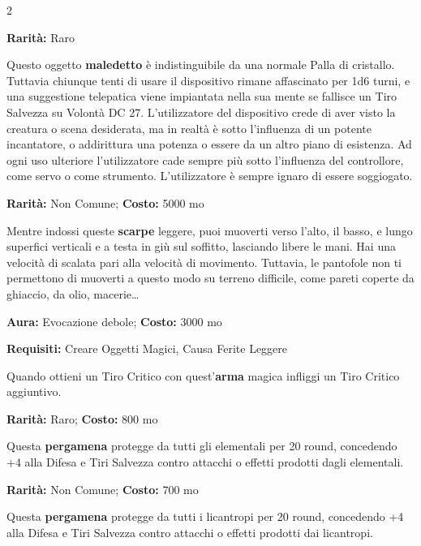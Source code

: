\begin{multicols}{2}

\textbf{Rarità:} Raro

Questo oggetto \textbf{maledetto} è indistinguibile da una normale Palla di cristallo. Tuttavia chiunque tenti di usare il dispositivo rimane affascinato per 1d6 turni, e una suggestione telepatica viene impiantata nella sua mente se fallisce un Tiro Salvezza su Volontà DC 27. L'utilizzatore del dispositivo crede di aver visto la creatura o scena desiderata, ma in realtà è sotto l'influenza di un potente incantatore, o addirittura una potenza o essere da un altro piano di esistenza. Ad ogni uso ulteriore l'utilizzatore cade sempre più sotto l'influenza del controllore, come servo o come strumento. L'utilizzatore è sempre ignaro di essere soggiogato.


\textbf{Rarità:} Non Comune; \textbf{Costo:} 5000 mo

Mentre indossi queste \textbf{scarpe} leggere, puoi muoverti verso l'alto, il basso, e lungo superfici verticali e a testa in giù sul soffitto, lasciando libere le mani. Hai una velocità di scalata pari alla velocità di movimento. Tuttavia, le pantofole non ti permettono di muoverti a questo modo su terreno difficile, come pareti coperte da ghiaccio, da olio, macerie…


\textbf{Aura:} Evocazione debole; \textbf{Costo:} 3000 mo

\textbf{Requisiti:} Creare Oggetti Magici, Causa Ferite Leggere

Quando ottieni un Tiro Critico con quest'\textbf{arma} magica infliggi un Tiro Critico aggiuntivo.


\textbf{Rarità:} Raro; \textbf{Costo:} 800 mo

Questa \textbf{pergamena} protegge da tutti gli elementali per 20 round, concedendo +4 alla Difesa e Tiri Salvezza contro attacchi o effetti prodotti dagli elementali.


\textbf{Rarità:} Non Comune; \textbf{Costo:} 700 mo

Questa \textbf{pergamena} protegge da tutti i licantropi per 20 round, concedendo +4 alla Difesa e Tiri Salvezza contro attacchi o effetti prodotti dai licantropi.


\end{multicols}
